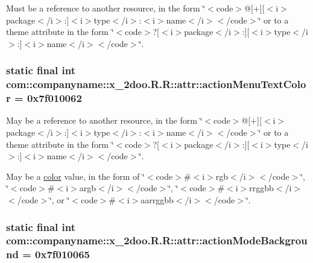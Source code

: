Must be a reference to another resource, in the form \char`\"{}$<$code$>$@\mbox{[}+\mbox{]}\mbox{[}$<$i$>$package$<$/i$>$:\mbox{]}$<$i$>$type$<$/i$>$:$<$i$>$name$<$/i$>$$<$/code$>$\char`\"{} or to a theme attribute in the form \char`\"{}$<$code$>$?\mbox{[}$<$i$>$package$<$/i$>$:\mbox{]}\mbox{[}$<$i$>$type$<$/i$>$:\mbox{]}$<$i$>$name$<$/i$>$$<$/code$>$\char`\"{}. \hypertarget{classcom_1_1companyname_1_1x__2doo_1_1_r_1_1attr_6572796995e450d68baacd8e8ff1d867}{
\subsubsection[{actionMenuTextColor}]{\setlength{\rightskip}{0pt plus 5cm}static final int com::companyname::x\_\-2doo.R.R::attr::actionMenuTextColor = 0x7f010062}}
\label{classcom_1_1companyname_1_1x__2doo_1_1_r_1_1attr_6572796995e450d68baacd8e8ff1d867}


May be a reference to another resource, in the form \char`\"{}$<$code$>$@\mbox{[}+\mbox{]}\mbox{[}$<$i$>$package$<$/i$>$:\mbox{]}$<$i$>$type$<$/i$>$:$<$i$>$name$<$/i$>$$<$/code$>$\char`\"{} or to a theme attribute in the form \char`\"{}$<$code$>$?\mbox{[}$<$i$>$package$<$/i$>$:\mbox{]}\mbox{[}$<$i$>$type$<$/i$>$:\mbox{]}$<$i$>$name$<$/i$>$$<$/code$>$\char`\"{}. 

May be a \hyperlink{classcom_1_1companyname_1_1x__2doo_1_1_r_1_1color}{color} value, in the form of \char`\"{}$<$code$>$\#$<$i$>$rgb$<$/i$>$$<$/code$>$\char`\"{}, \char`\"{}$<$code$>$\#$<$i$>$argb$<$/i$>$$<$/code$>$\char`\"{}, \char`\"{}$<$code$>$\#$<$i$>$rrggbb$<$/i$>$$<$/code$>$\char`\"{}, or \char`\"{}$<$code$>$\#$<$i$>$aarrggbb$<$/i$>$$<$/code$>$\char`\"{}. \hypertarget{classcom_1_1companyname_1_1x__2doo_1_1_r_1_1attr_273e7a6b78866cbc1406f0ca5f6bf928}{
\subsubsection[{actionModeBackground}]{\setlength{\rightskip}{0pt plus 5cm}static final int com::companyname::x\_\-2doo.R.R::attr::actionModeBackground = 0x7f010065}}
\label{classcom_1_1companyname_1_1x__2doo_1_1_r_1_1attr_273e7a6b78866cbc1406f0ca5f6bf928}


